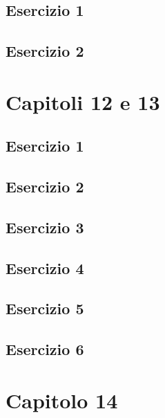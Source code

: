 \documentclass[a4paper,12pt,oneside]{book}
\begin{document}
\hypertarget{esercizio-1-7}{%
\subsection{Esercizio 1}\label{esercizio-1-7}}

\hypertarget{esercizio-2-6}{%
\subsection{Esercizio 2}\label{esercizio-2-6}}

\hypertarget{capitoli-12-e-13}{%
\section{Capitoli 12 e 13}\label{capitoli-12-e-13}}

\hypertarget{esercizio-1-8}{%
\subsection{Esercizio 1}\label{esercizio-1-8}}

\hypertarget{esercizio-2-7}{%
\subsection{Esercizio 2}\label{esercizio-2-7}}

\hypertarget{esercizio-3-6}{%
\subsection{Esercizio 3}\label{esercizio-3-6}}

\hypertarget{esercizio-4-4}{%
\subsection{Esercizio 4}\label{esercizio-4-4}}

\hypertarget{esercizio-5-3}{%
\subsection{Esercizio 5}\label{esercizio-5-3}}

\hypertarget{esercizio-6-2}{%
\subsection{Esercizio 6}\label{esercizio-6-2}}

\hypertarget{capitolo-14}{%
\section{Capitolo 14}\label{capitolo-14}}
\end{document}
